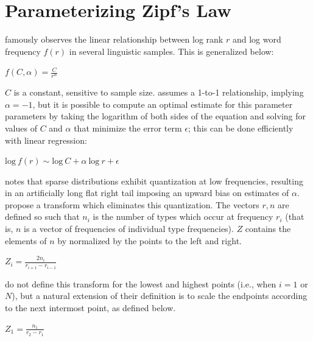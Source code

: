 \chapter{Parameterizing Zipf's Law} 
\label{zr}

\citet{Zipf1949} famously observes the linear relationship between log rank $r$ and log word frequency $f(r)$ in several linguistic samples. This is generalized below:

\begin{unlabeledexample} 
$\displaystyle f(C, \alpha) = \frac{C}{r^\alpha}$ 
\end{unlabeledexample} 

\noindent 
$C$ is a constant, sensitive to sample size. \citeauthor{Zipf1949} assumes a 1-to-1 relationship, implying $\alpha = -1$, but it is possible to compute an optimal estimate for this parameter parameters by taking the logarithm of both sides of the equation and solving for values of $C$ and $\alpha$ that minimize the error term $\epsilon$; this can be done efficiently with linear regression:

\begin{unlabeledexample} 
$\displaystyle \textrm{log}~f(r) \sim \textrm{log}~C + \alpha~\textrm{log}~r + \epsilon$  
\end{unlabeledexample}

\citet{Good1953} notes that sparse distributions exhibit quantization at low frequencies, resulting in an artificially long flat right tail imposing an upward bias on estimates of $\alpha$. \citet[][29]{Church1991} propose a transform which eliminates this quantization. The vectors $r, n$ are defined so such that $n_i$ is the number of types which occur at frequency $r_i$ (that is, $n$ is a vector of frequencies of individual type frequencies). $Z$ contains the elements of $n$ by normalized by the points to the left and right.

\begin{unlabeledexample}
$\displaystyle Z_i = \frac{2 n_i}{r_{i + 1} - r_{i - 1}}$
\end{unlabeledexample}

\noindent \citeauthor{Church1991} do not define this transform for the lowest and highest points (i.e., when $i = 1$ or $N$), but a natural extension of their definition is to scale the endpoints according to the next intermost point, as defined below.

\begin{unlabeledexample}
$\displaystyle Z_1 = \frac{n_1}{r_2 - r_1}$
\end{unlabeledexample}

